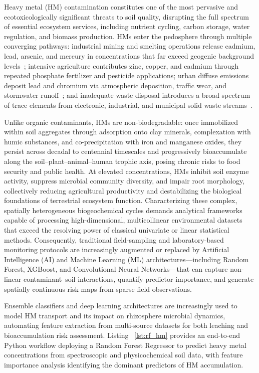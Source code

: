 \documentclass[environremediat,article,accept,pdftex,oneauthor]{Definitions/mdpi}
\begin{document}
Heavy metal (HM) contamination constitutes one of the most pervasive and ecotoxicologically significant threats to soil quality, disrupting the full spectrum of essential ecosystem services, including nutrient cycling, carbon storage, water regulation, and biomass production. HMs enter the pedosphere through multiple converging pathways: industrial mining and smelting operations release cadmium, lead, arsenic, and mercury in concentrations that far exceed geogenic background levels~\cite{Li2019,Wang2020,AliZerrouki2021,Rasafi2021,EEA2009}; intensive agriculture contributes zinc, copper, and cadmium through repeated phosphate fertilizer and pesticide applications; urban diffuse emissions deposit lead and chromium via atmospheric deposition, traffic wear, and stormwater runoff~\cite{Adewumi2024}; and inadequate waste disposal introduces a broad spectrum of trace elements from electronic, industrial, and municipal solid waste streams~\cite{LindhLemenkova2022a}. 

{Unlike organic contaminants, HMs are non-biodegradable: once immobilized within soil aggregates through adsorption onto clay minerals, complexation with humic substances, and co-precipitation with iron and manganese oxides, they persist across decadal to centennial timescales and progressively bioaccumulate along the soil--plant--animal--human trophic axis, posing chronic risks to food security and public health}. At elevated concentrations, HMs inhibit soil enzyme activity, suppress microbial community diversity, and impair root morphology, collectively reducing agricultural productivity and destabilizing the biological foundations of terrestrial ecosystem function. {Characterizing these complex, spatially heterogeneous biogeochemical cycles demands analytical frameworks capable of processing high-dimensional, multicollinear environmental datasets that exceed the resolving power of classical univariate or linear statistical methods}. Consequently, traditional field-sampling and laboratory-based monitoring protocols are increasingly augmented or replaced by Artificial Intelligence (AI) and Machine Learning (ML) architectures---including Random Forest, XGBoost, and Convolutional Neural Networks---that can capture non-linear contaminant--soil interactions, quantify predictor importance, and generate spatially continuous risk maps from sparse field observations.

{Ensemble classifiers and deep learning architectures are increasingly used to model HM transport and its impact on rhizosphere microbial dynamics, automating feature extraction from multi-source datasets for both leaching and bioaccumulation risk assessment.} Listing%
~\ref{lst:rf_hm} provides an end-to-end Python workflow deploying a Random Forest Regressor to predict heavy metal concentrations from spectroscopic and physicochemical soil data, with feature importance analysis identifying the dominant predictors of HM accumulation.
\end{document}

